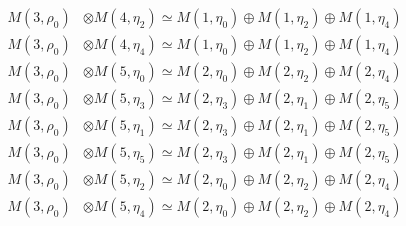 \begin{align*}
M(3,\rho_{0}) &\otimes M(4,\eta_{2}) \simeq M(1,\eta_{0}) \oplus M(1,\eta_{2}) \oplus M(1,\eta_{4})\\
M(3,\rho_{0}) &\otimes M(4,\eta_{4}) \simeq M(1,\eta_{0}) \oplus M(1,\eta_{2}) \oplus M(1,\eta_{4})\\
M(3,\rho_{0}) &\otimes M(5,\eta_{0}) \simeq M(2,\eta_{0}) \oplus M(2,\eta_{2}) \oplus M(2,\eta_{4})\\
M(3,\rho_{0}) &\otimes M(5,\eta_{3}) \simeq M(2,\eta_{3}) \oplus M(2,\eta_{1}) \oplus M(2,\eta_{5})\\
M(3,\rho_{0}) &\otimes M(5,\eta_{1}) \simeq M(2,\eta_{3}) \oplus M(2,\eta_{1}) \oplus M(2,\eta_{5})\\
M(3,\rho_{0}) &\otimes M(5,\eta_{5}) \simeq M(2,\eta_{3}) \oplus M(2,\eta_{1}) \oplus M(2,\eta_{5})\\
M(3,\rho_{0}) &\otimes M(5,\eta_{2}) \simeq M(2,\eta_{0}) \oplus M(2,\eta_{2}) \oplus M(2,\eta_{4})\\
M(3,\rho_{0}) &\otimes M(5,\eta_{4}) \simeq M(2,\eta_{0}) \oplus M(2,\eta_{2}) \oplus M(2,\eta_{4})\\
\end{align*}

